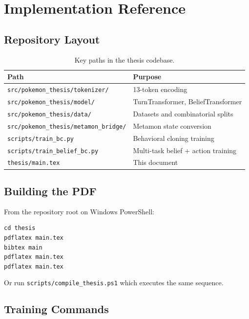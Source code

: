 \chapter{Implementation Reference}
\label{app:implementation}

\section{Repository Layout}

\begin{table}[ht]
  \centering
  \caption{Key paths in the thesis codebase.}
  \begin{tabular}{ll}
    \toprule
    Path & Purpose \\
    \midrule
    \texttt{src/pokemon\_thesis/tokenizer/} & 13-token encoding \\
    \texttt{src/pokemon\_thesis/model/} & TurnTransformer, BeliefTransformer \\
    \texttt{src/pokemon\_thesis/data/} & Datasets and combinatorial splits \\
    \texttt{src/pokemon\_thesis/metamon\_bridge/} & Metamon state conversion \\
    \texttt{scripts/train\_bc.py} & Behavioral cloning training \\
    \texttt{scripts/train\_belief\_bc.py} & Multi-task belief + action training \\
    \texttt{thesis/main.tex} & This document \\
    \bottomrule
  \end{tabular}
\end{table}

\section{Building the PDF}

From the repository root on Windows PowerShell:

\begin{verbatim}
cd thesis
pdflatex main.tex
bibtex main
pdflatex main.tex
pdflatex main.tex
\end{verbatim}

Or run \texttt{scripts/compile\_thesis.ps1} which executes the same sequence.

\section{Training Commands}

